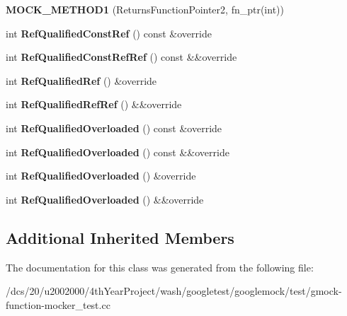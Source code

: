 \begin{DoxyCompactItemize}
{\bfseries M\+O\+C\+K\+\_\+\+M\+E\+T\+H\+O\+D1} (Returns\+Function\+Pointer2, fn\+\_\+ptr(int))
\item 
\mbox{\label{classtesting_1_1gmock__function__mocker__test_1_1LegacyMockFoo_a5b586a1db3bbe520061f450551f238b3}} 
int {\bfseries Ref\+Qualified\+Const\+Ref} () const \&override
\item 
\mbox{\label{classtesting_1_1gmock__function__mocker__test_1_1LegacyMockFoo_a99b57a335543fe6828ff2c70c0a726f5}} 
int {\bfseries Ref\+Qualified\+Const\+Ref\+Ref} () const \&\&override
\item 
\mbox{\label{classtesting_1_1gmock__function__mocker__test_1_1LegacyMockFoo_a53204e0e486eb2240659c468259c5f27}} 
int {\bfseries Ref\+Qualified\+Ref} () \&override
\item 
\mbox{\label{classtesting_1_1gmock__function__mocker__test_1_1LegacyMockFoo_af7bb0a91b68ba5aaeca67615c99a20c3}} 
int {\bfseries Ref\+Qualified\+Ref\+Ref} () \&\&override
\item 
\mbox{\label{classtesting_1_1gmock__function__mocker__test_1_1LegacyMockFoo_ae21eb58ea09d921bc244859687c21a16}} 
int {\bfseries Ref\+Qualified\+Overloaded} () const \&override
\item 
\mbox{\label{classtesting_1_1gmock__function__mocker__test_1_1LegacyMockFoo_a3fef0197e50b004509d02cfa4c6da20a}} 
int {\bfseries Ref\+Qualified\+Overloaded} () const \&\&override
\item 
\mbox{\label{classtesting_1_1gmock__function__mocker__test_1_1LegacyMockFoo_a6544443eb2ab978a74c4e1dd5e92675e}} 
int {\bfseries Ref\+Qualified\+Overloaded} () \&override
\item 
\mbox{\label{classtesting_1_1gmock__function__mocker__test_1_1LegacyMockFoo_ab88054355288ae3fc6bdd3fbf82044d2}} 
int {\bfseries Ref\+Qualified\+Overloaded} () \&\&override
\end{DoxyCompactItemize}
\subsection*{Additional Inherited Members}


The documentation for this class was generated from the following file\+:\begin{DoxyCompactItemize}
\item 
/dcs/20/u2002000/4th\+Year\+Project/wash/googletest/googlemock/test/gmock-\/function-\/mocker\+\_\+test.\+cc\end{DoxyCompactItemize}
